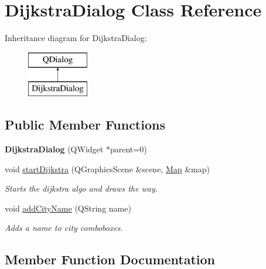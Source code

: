 \hypertarget{class_dijkstra_dialog}{}\section{Dijkstra\+Dialog Class Reference}
\label{class_dijkstra_dialog}
Inheritance diagram for Dijkstra\+Dialog\+:\begin{figure}[H]
\begin{center}
\leavevmode
\includegraphics[height=2.000000cm]{class_dijkstra_dialog}
\end{center}
\end{figure}
\subsection*{Public Member Functions}
\begin{DoxyCompactItemize}
\item 
\mbox{\label{class_dijkstra_dialog_a507b5273e2491adfe5d070a7f989ad3c}} 
{\bfseries Dijkstra\+Dialog} (Q\+Widget $\ast$parent=0)
\item 
void \hyperlink{class_dijkstra_dialog_ae4bd48d8dc7d10e4cda0e8638bb1d22e}{start\+Dijkstra} (Q\+Graphics\+Scene \&scene, \hyperlink{class_map}{Map} \&map)
\begin{DoxyCompactList}\small\item\em Starts the dijkstra algo and draws the way. \end{DoxyCompactList}\item 
void \hyperlink{class_dijkstra_dialog_ae4d6de8a537996c265140d3415acd031}{add\+City\+Name} (Q\+String name)
\begin{DoxyCompactList}\small\item\em Adds a name to city comboboxes. \end{DoxyCompactList}\end{DoxyCompactItemize}


\subsection{Member Function Documentation}
\mbox{\label{class_dijkstra_dialog_ae4d6de8a537996c265140d3415acd031}} 
